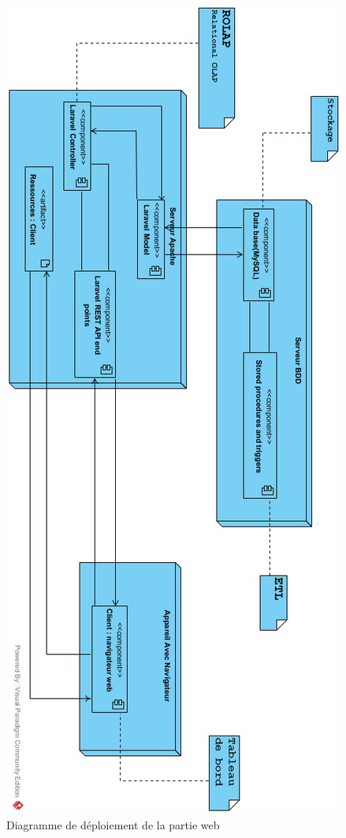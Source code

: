 \begin{figure}[!htbp]
	\begin{center}
		\includegraphics[scale=0.75]{images/deploy_web.png}
	\caption{Diagramme de déploiement de la partie web}
		\label{use_case_diagramme_one}
	\end{center}
\end{figure}

